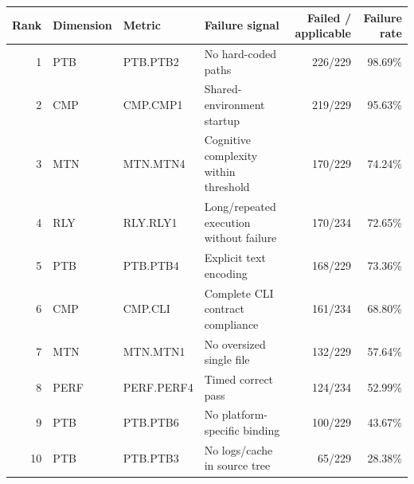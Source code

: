 \begin{tabular}{rlllrr}
\toprule
Rank & Dimension & Metric & Failure signal & Failed / applicable & Failure rate \\
\midrule
1 & PTB & PTB.PTB2 & No hard-coded paths & 226/229 & 98.69\% \\
2 & CMP & CMP.CMP1 & Shared-environment startup & 219/229 & 95.63\% \\
3 & MTN & MTN.MTN4 & Cognitive complexity within threshold & 170/229 & 74.24\% \\
4 & RLY & RLY.RLY1 & Long/repeated execution without failure & 170/234 & 72.65\% \\
5 & PTB & PTB.PTB4 & Explicit text encoding & 168/229 & 73.36\% \\
6 & CMP & CMP.CLI & Complete CLI contract compliance & 161/234 & 68.80\% \\
7 & MTN & MTN.MTN1 & No oversized single file & 132/229 & 57.64\% \\
8 & PERF & PERF.PERF4 & Timed correct pass & 124/234 & 52.99\% \\
9 & PTB & PTB.PTB6 & No platform-specific binding & 100/229 & 43.67\% \\
10 & PTB & PTB.PTB3 & No logs/cache in source tree & 65/229 & 28.38\% \\
\bottomrule
\end{tabular}
